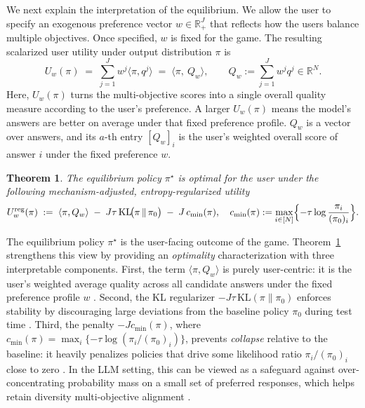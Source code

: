 \documentclass{article}
\newtheorem{theorem}{Theorem}
\begin{document}
We next explain the interpretation of the equilibrium. We allow the user to specify an exogenous preference vector $w\in\mathbb R_+^J$ that reflects how the users
balance multiple objectives. Once specified, $w$ is fixed for the game.
The resulting scalarized user utility under output distribution $\pi$ is
\[
U_w(\pi)
\;=\;\sum_{j=1}^J w^j \langle \pi,q^j\rangle
\;=\;\big\langle \pi,\ Q_w\big\rangle,
\qquad
Q_w:=\sum_{j=1}^J w^j q^j\in\mathbb R^N.
\]
Here, $U_w(\pi)$ turns the multi-objective scores into a single overall quality measure according to the user's preference. A larger $U_w(\pi)$ means the model's answers are better on average under that fixed preference profile. $Q_w$ is a vector over answers, and its $a$-th entry $[Q_w]_i$ is the user's weighted overall score of answer $i$ under the fixed preference $w$.

\begin{theorem}
\label{thm:user_optimal_reg_general}
The equilibrium policy $\pi^\star$ is optimal for the user under the following mechanism-adjusted, entropy-regularized utility
\[
U^{\mathrm{reg}}_w(\pi)
\;:=\;
\langle \pi,Q_w\rangle
\;-\;
J\tau\,\mathrm{KL}\!\bigl(\pi\,\|\,\pi_0\bigr)
\;-\;
J\,c_{\min}(\pi),
\quad
c_{\min}(\pi):=\max_{i\in[N]}\Bigl\{-\tau\log\frac{\pi_i}{(\pi_0)_i}\Bigr\}.
\]
\end{theorem}

The equilibrium policy $\pi^\star$ is the user-facing outcome of the game.
Theorem~\ref{thm:user_optimal_reg_general} strengthens this view by providing an \emph{optimality} characterization with three interpretable components.
First, the term $\langle \pi,Q_w\rangle$ is purely user-centric: it is the user's weighted average quality across all candidate answers under the fixed preference profile $w$ \citep{abels2019dynamic}.
Second, the KL regularizer $-J\tau\,\mathrm{KL}(\pi\|\pi_0)$ enforces stability by discouraging large deviations from the baseline policy $\pi_0$ during test time \citep{schulman2015trust}.
Third, the penalty $-Jc_{\min}(\pi)$, where $c_{\min}(\pi)=\max_i\{-\tau\log(\pi_i/(\pi_0)_i)\}$, prevents \emph{collapse} relative to the baseline: it heavily penalizes policies that drive some likelihood ratio $\pi_i/(\pi_0)_i$ close to zero \citep{liu2020ipo}. In the LLM setting, this can be viewed as a safeguard against over-concentrating probability mass on a small set of preferred responses, which helps retain diversity multi-objective alignment \citep{slocumdiverse}.
\end{document}

